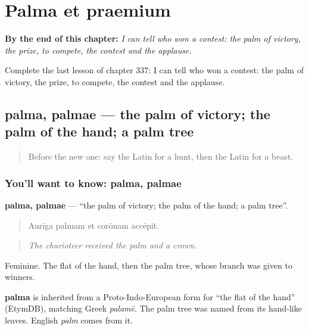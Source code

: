 
\chapter{Palma et praemium}
\label{ch:la-palma-et-praemium}

\begin{chapteropening}
\textbf{By the end of this chapter:} \emph{I can tell who won a contest: the palm of victory, the prize, to compete, the contest and the applause.}

Complete the last lesson of chapter 337: I can tell who won a contest: the palm of victory, the prize, to compete, the contest and the applause.
\end{chapteropening}

\section[palma, palmae]{palma, palmae — the palm of victory; the palm of the hand; a palm tree}

\label{lesson:LA-C337-palma}



\begin{quote}
Before the new one: say the Latin for a hunt, then the Latin for a beast.
\end{quote}

\subsection*{You'll want to know: palma, palmae}
\textbf{palma, palmae} — \textquotedblleft{}the palm of victory; the palm of the hand; a palm tree\textquotedblright{}.

\begin{quote}
Aurīga palmam et corōnam accēpit.
\end{quote}

\begin{quote}
\emph{The charioteer received the palm and a crown.}
\end{quote}

Feminine. The flat of the hand, then the palm tree, whose branch was given to winners.

\begin{cousinweb}
\textbf{palma} is inherited from a Proto-Indo-European form for \textquotedblleft{}the flat of the hand\textquotedblright{} (EtymDB), matching Greek \emph{palamē}. The palm tree was named from its hand-like leaves. English \emph{palm} comes from it.
\end{cousinweb}

